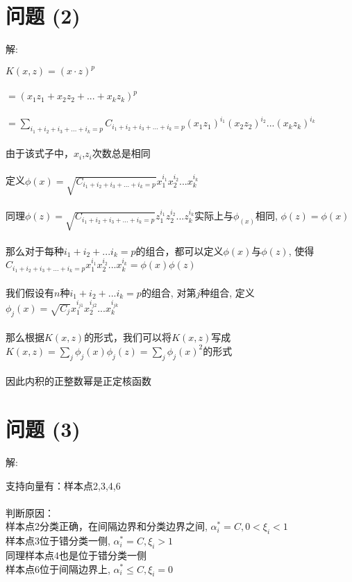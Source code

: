 \documentclass[]{article}
\begin{document}
\section{问题 (2)}
\begin{flushleft}
	解:
\end{flushleft}
$K(x,z)=(x\cdot z)^p$\\\\
$=(x_1z_1+x_2z_2+...+x_kz_k)^p$\\\\
$=\sum_{i_1+i_2+i_3+...+i_k=p}C_{i_1+i_2+i_3+...+i_k=p}(x_1z_1)^{i_1}(x_2z_2)^{i_2}...(x_kz_k)^{i_k}$\\\\
由于该式子中，$x_i$,$z_i$次数总是相同\\\\
定义$\phi(x)=\sqrt{C_{i_1+i_2+i_3+...+i_k=p}}x_1^{i_1}x_2^{i_2}...x_k^{i_k}$\\\\
同理$\phi(z)=\sqrt{C_{i_1+i_2+i_3+...+i_k=p}}z_1^{i_1}z_2^{i_2}...z_k^{i_k}$实际上与$\phi_(x)$相同, $\phi(z)=\phi(x)$\\\\
那么对于每种$i_1+i_2+...i_k=p$的组合，都可以定义$\phi(x)$与$\phi(z)$, 使得$C_{i_1+i_2+i_3+...+i_k=p}x_1^{i_1}x_2^{i_2}...x_k^{i_k}=\phi(x)\phi(z)$\\\\ 
我们假设有$n$种$i_1+i_2+...i_k=p$的组合, 对第$j$种组合, 定义$\phi_j(x)=\sqrt{C_j}x_1^{i_{j1}}x_2^{i_{j2}}...x_k^{i_{jk}}$\\\\
那么根据$K(x,z)$的形式，我们可以将$K(x,z)$写成$K(x,z)=\sum_{j}\phi_j(x)\phi_j(z)=\sum_{j}\phi_j(x)^2$的形式\\\\
因此内积的正整数幂是正定核函数
\section{问题 (3)}
\begin{flushleft}
	解:
\end{flushleft}
支持向量有：样本点2,3,4,6\\\\
判断原因：\\
样本点2分类正确，在间隔边界和分类边界之间, $\alpha^*_i=C,0<\xi_i<1$\\
样本点3位于错分类一侧, $\alpha^*_i=C,\xi_i>1$\\
同理样本点4也是位于错分类一侧\\
样本点6位于间隔边界上, $\alpha^*_i\leq C,\xi_i=0$\\
\end{document}
